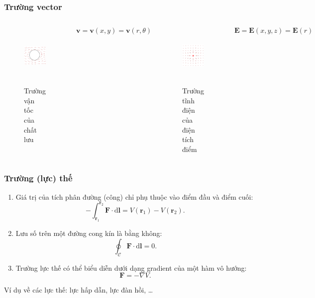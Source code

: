 \begin{frame}
    \frametitle{Trường vector}
    \begin{columns}
            \begin{figure}
                \centering
                \includegraphics[width=4cm, height=3cm]{Content/Figure/streamline.png}
                \caption{Trường vận tốc của chất lưu}
            \end{figure}
            \[\mathbf{v}=\mathbf{v}(x,y)=\mathbf{v}(r,\theta)\]
            \begin{figure}
                \centering
                \includegraphics[width=4cm, height=3cm]{Content/Figure/electric_charge.png}
                \caption{Trường tĩnh điện của điện tích điểm}
            \end{figure}
            \[\mathbf{E}=\mathbf{E}(x,y,z)=\mathbf{E}(r)\]
    \end{columns}
\end{frame}
\begin{frame}
    \frametitle{Trường (lực) thế}
    \begin{enumerate}
        \item Giá trị của tích phân đường (công) chỉ phụ thuộc vào điểm đầu và điểm cuối: \[-\int_{\mathbf{r}_1}^{\mathbf{r}_2}\mathbf{F}\cdot\text{d}\mathbf{l}=V(\mathbf{r}_1)-V(\mathbf{r}_2).\]
        \item Lưu số trên một đường cong kín là bằng không: \[\oint_{\mathcal{C}}\mathbf{F}\cdot\text{d}\mathbf{l}=0.\]
        \item Trường lực thế có thể biểu diễn dưới dạng gradient của một hàm vô hướng: \[\mathbf{F}=-\nabla V.\]
    \end{enumerate}
    \vspace{-5pt}

    Ví dụ về các lực thế: lực hấp dẫn, lực đàn hồi, \dots
\end{frame}
